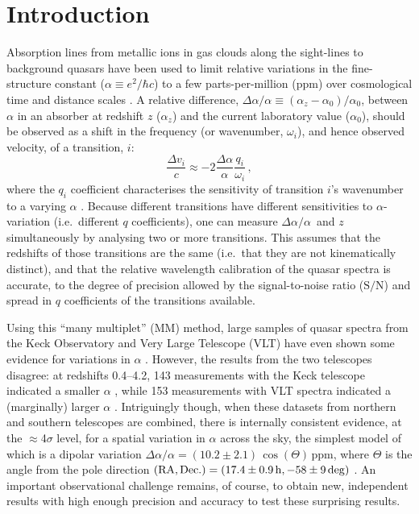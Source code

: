 \documentclass[fleqn,usenatbib,usedcolumn]{mnras}
\newcommand{\SN}{\ensuremath{\textrm{S/N}}}
\newcommand{\daa}{\ensuremath{\Delta\alpha/\alpha}}
\begin{document}

\section{Introduction}\label{s:intro}

Absorption lines from metallic ions in gas clouds along the sight-lines to background quasars have been used to limit relative variations in the fine-structure constant ($\alpha\equiv e^2/\hbar c$) to a few parts-per-million (ppm) over cosmological time and distance scales \citep[e.g.][]{Webb:1999:884,Murphy:2001:1208,Murphy:2003:609,Quast:2004:L7,Levshakov:2005:827,Levshakov:2007:1077,Molaro:2008:173,Murphy:2008:1053,Webb:2011:191101,Agafonova:2011:28,King:2012:3370,Molaro:2013:A68,Songaila:2014:103}. A relative difference, $\daa\equiv(\alpha_z-\alpha_0)/\alpha_0$, between $\alpha$ in an absorber at redshift $z$ ($\alpha_z$) and the current laboratory value ($\alpha_0$), should be observed as a shift in the frequency (or wavenumber, $\omega_i$), and hence observed velocity, of a transition, $i$:
\begin{equation}\label{e:daa}
\frac{\Delta v_i}{c} \approx -2\frac{\Delta\alpha}{\alpha}\frac{q_i}{\omega_i}\,,
\end{equation}
where the $q_i$ coefficient characterises the sensitivity of transition $i$'s wavenumber to a varying $\alpha$ \citep{Dzuba:1999:888,Webb:1999:884}. Because different transitions have different sensitivities to $\alpha$-variation (i.e.\ different $q$ coefficients), one can measure \daa\ and $z$ simultaneously by analysing two or more transitions. This assumes that the redshifts of those transitions are the same (i.e.\ that they are not kinematically distinct), and that the relative wavelength calibration of the quasar spectra is accurate, to the degree of precision allowed by the signal-to-noise ratio (\SN) and spread in $q$ coefficients of the transitions available.

Using this ``many multiplet'' (MM) method, large samples of quasar spectra from the Keck Observatory and Very Large Telescope (VLT) have even shown some evidence for variations in $\alpha$ \citep[e.g.][]{Webb:1999:884,Murphy:2001:1208,Murphy:2003:609,Webb:2011:191101}. However, the results from the two telescopes disagree: at redshifts 0.4--4.2, 143 measurements with the Keck telescope indicated a smaller $\alpha$ \citep[$\daa=-5.7\pm1.1_{\rm stat}$\,ppm;][]{Murphy:2004:131}, while 153 measurements with VLT spectra indicated a (marginally) larger $\alpha$ \citep[$\daa=2.1\pm1.2_{\rm stat}$\,ppm;][]{King:2012:3370}. Intriguingly though, when these datasets from northern and southern telescopes are combined, there is internally consistent evidence, at the $\approx$4$\sigma$ level, for a spatial variation in $\alpha$ across the sky, the simplest model of which is a dipolar variation $\daa=(10.2\pm2.1)\,\cos(\Theta)$\,ppm, where $\Theta$ is the angle from the pole direction ${\rm (RA,Dec.)}=(17.4\pm0.9\,{\rm h},-58\pm9\,{\rm deg})$ \citep{Webb:2011:191101,King:2012:3370}. An important observational challenge remains, of course, to obtain new, independent results with high enough precision and accuracy to test these surprising results.
\end{document}
